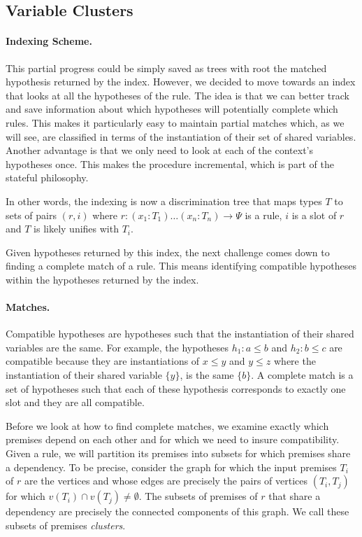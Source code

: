 \documentclass[runningheads]{llncs}
\newcommand{\jcom}[1]{{\color{orange}{Jannis: #1}} }
\begin{document}
\jcom{partial match state is composed of rule states}

\jcom{rule states contain variable maps}

\subsection{Variable Clusters}%
\label{sec:clusters}

\jcom{=== Initial draft follows}

\paragraph{Indexing Scheme.}
This partial progress could be simply saved as trees with root the matched hypothesis returned by the index.
However, we decided to move towards an index that looks at all the hypotheses of the rule.
The idea is that we can better track and save information about which hypotheses will potentially complete which rules.
This makes it particularly easy to maintain partial matches which, as we will see, are classified in terms of the instantiation of their set of shared variables.
Another advantage is that we only need to look at each of the context's hypotheses once.
This makes the procedure incremental, which is part of the stateful philosophy.

In other words, the indexing is now a discrimination tree that maps types $T$ to sets of pairs $(r,i)$ where $r : (x_1 : T_1) \dots (x_n : T_n) \to \Psi$ is a rule, $i$ is a slot of $r$ and $T$ is likely unifies with $T_i$.

Given hypotheses returned by this index, the next challenge comes down to finding a complete match of a rule.
This means identifying compatible hypotheses within the hypotheses returned by the index.

\paragraph{Matches.}
Compatible hypotheses are hypotheses such that the instantiation of their shared variables are the same.
For example, the hypotheses $h_1 : a \leq b$ and $h_2 : b \leq c$ are compatible because they are instantiations of $x \leq y$ and $y \leq z$ where the instantiation of their shared variable $\{y\}$, is the same $\{b\}$.
A complete match is a set of hypotheses such that each of these hypothesis corresponds to exactly one slot and they are all compatible.

Before we look at how to find complete matches, we examine exactly which premises depend on each other and for which we need to insure compatibility.
Given a rule, we will partition its premises into subsets for which premises share a dependency.
To be precise, consider the graph for which the input premises $T_i$ of $r$ are the vertices and whose edges are precisely the pairs of vertices $(T_i, T_j)$ for which $v(T_i) \cap v(T_j) \neq \emptyset$.
The subsets of premises of $r$ that share a dependency are precisely the connected components of this graph.
We call these subsets of premises \textit{clusters}.
\end{document}
